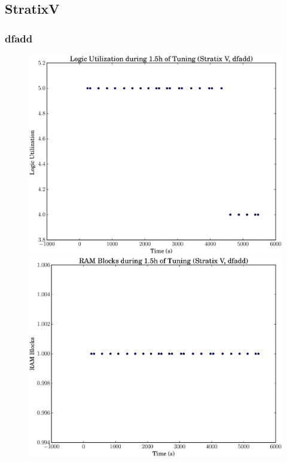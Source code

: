 \documentclass[12pt, a4paper]{article}
\begin{document}
\newpage

\subsection{StratixV}

\subsubsection{dfadd}

\begin{figure}[htpb]
    \centering
    \noindent
    \begin{minipage}{.48\textwidth}
        \centering
        \includegraphics[scale=.25]{dfadd_lu_5400_chstone_StratixV}
    \end{minipage}%
    \hfill
    \begin{minipage}{.48\textwidth}
        \centering
        \includegraphics[scale=.25]{dfadd_ram_5400_chstone_StratixV}
    \end{minipage}%


\end{figure}
\end{document}
